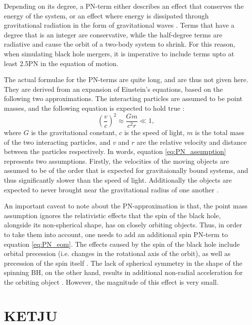 \documentclass[english, twoside]{HYgradu}
\begin{document}
Depending on its degree, a PN-term either describes an effect that conserves the energy of the system, or an effect where energy is dissipated through gravitational radiation in the form of gravitational waves \citep{Mora2004}. Terms that have a degree that is an integer are conservative, while the half-degree terms are radiative and cause the orbit of a two-body system to shrink. For this reason, when simulating black hole mergers, it is imperative to include terms upto at least 2.5PN in the equation of motion.

The actual formulae for the PN-terms are quite long, and are thus not given here. They are derived from an expansion of Einstein's equations, based on the following two approximations. The interacting particles are assumed to be point masses, and the following equation is expected to hold true \citep{MerrittBook}:
\begin{equation}
\left( \frac{v}{c} \right)^2 \approx \frac{Gm}{c^2r} \ll 1, \label{eq:PN_assumption}
\end{equation}
where $G$ is the gravitational constant, $c$ is the speed of light, $m$ is the total mass of the two interacting particles, and $v$ and $r$ are the relative velocity and distance between the particles respectively. In words, equation \ref{eq:PN_assumption} represents two assumptions. Firstly, the velocities of the moving objects are assumed to be of the order that is expected for gravitaionally bound systems, and thus significantly slower than the speed of light. Additionally the objects are expected to never brought near the gravitational radius of one another \citep{MerrittBook}. 

An important caveat to note about the PN-approximation is that, the point mass assumption ignores the relativistic effects that the spin of the black hole, alongside its non-spherical shape, has on closely orbiting objects. Thus, in order to take them into account, one needs to add an additional spin PN-term to equation \ref{eq:PN_eom}. The effects caused by the spin of the black hole include orbital precession (i.e. changes in the rotational axis of the orbit), as well as precession of the spin itself \citep{Kidder1995}. The lack of spherical symmetry in the shape of the spinning BH, on the other hand, results in additional non-radial acceleration for the orbiting object \citep{MerrittBook}. However, the magnitude of this effect is very small.

\chapter{KETJU} \label{chapter:3}
\end{document}
